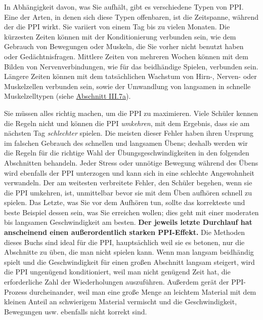 In Abhängigkeit davon, was Sie aufhält, gibt es verschiedene Typen von PPI.
Eine der Arten, in denen sich diese Typen offenbaren, ist die Zeitspanne, während der die PPI wirkt.
Sie variiert von einem Tag bis zu vielen Monaten.
Die kürzesten Zeiten können mit der Konditionierung verbunden sein, wie dem Gebrauch von Bewegungen oder Muskeln, die Sie vorher nicht benutzt haben oder Gedächtnisfragen.
Mittlere Zeiten von mehreren Wochen können mit dem Bilden von Nervenverbindungen, wie für das beidhändige Spielen, verbunden sein.
Längere Zeiten können mit dem tatsächlichen Wachstum von Hirn-, Nerven- oder Muskelzellen verbunden sein, sowie der Umwandlung von langsamen in schnelle Muskelzelltypen (siehe \hyperref[c1iii7aMuskeln]{Abschnitt III.7a}).

Sie müssen alles richtig machen, um die PPI zu maximieren.
Viele Schüler kennen die Regeln nicht und können die PPI \textit{umkehren}, mit dem Ergebnis, dass sie am nächsten Tag \textit{schlechter} spielen.
Die meisten dieser Fehler haben ihren Ursprung im falschen Gebrauch des schnellen und langsamen Übens; deshalb werden wir die Regeln für die richtige Wahl der Übungsgeschwindigkeiten in den folgenden Abschnitten behandeln.
Jeder Stress oder unnötige Bewegung während des Übens wird ebenfalls der PPI unterzogen und kann sich in eine schlechte Angewohnheit verwandeln.
Der am weitesten verbreitete Fehler, den Schüler begehen, wenn sie die PPI umkehren, ist, unmittelbar bevor sie mit dem Üben aufhören schnell zu spielen.
Das Letzte, was Sie vor dem Aufhören tun, sollte das korrekteste und beste Beispiel dessen sein, was Sie erreichen wollen; dies geht mit einer moderaten bis langsamen Geschwindigkeit am besten.
\textbf{Der jeweils letzte Durchlauf hat anscheinend einen außerordentlich starken PPI-Effekt.}
Die Methoden dieses Buchs sind ideal für die PPI, hauptsächlich weil sie es betonen, nur die Abschnitte zu üben, die man nicht spielen kann.
Wenn man langsam beidhändig spielt und die Geschwindigkeit für einen großen Abschnitt langsam steigert, wird die PPI ungenügend konditioniert, weil man nicht genügend Zeit hat, die erforderliche Zahl der Wiederholungen auszuführen.
Außerdem gerät der PPI-Prozess durcheinander, weil man eine große Menge an leichtem Material mit dem kleinen Anteil an schwierigem Material vermischt und die Geschwindigkeit, Bewegungen usw. ebenfalls nicht korrekt sind.

